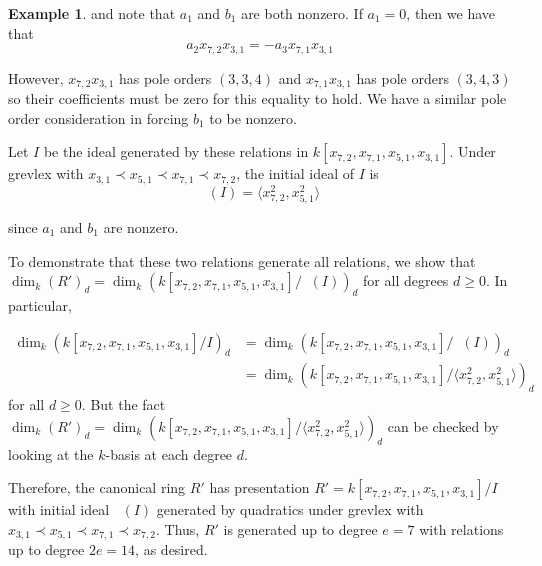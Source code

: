 \documentclass{amsart}
\theoremstyle{plain}
\theoremstyle{definition}
\newtheorem{example}[thm]{Example}
\theoremstyle{remark}
\numberwithin{equation}{section}
\DeclareMathOperator{\initial}{in_\prec}
\begin{document}
\begin{example}
\noindent
and note that $a_1$ and $b_1$ are both nonzero. If $a_1 = 0$, then we
have that
\[
	a_2 x_{7, 2} x_{3, 1} = -a_3 x_{7, 1} x_{3, 1}
\]

\noindent
However, $x_{7, 2} x_{3, 1}$ has pole orders $(3, 3, 4)$ and
$x_{7, 1} x_{3, 1}$ has pole orders $(3, 4, 3)$ so their
coefficients must be zero for this equality to hold. We have a
similar pole order consideration in forcing $b_1$ to be nonzero.

Let $I$ be the ideal generated by these relations in
$k[x_{7, 2}, x_{7, 1}, x_{5, 1}, x_{3, 1}]$. Under grevlex with
$x_{3,1} \prec x_{5,1} \prec x_{7,1} \prec x_{7,2}$, the initial
ideal of $I$ is
\[
	\initial(I) = \langle x_{7, 2}^2, x_{5, 1}^2 \rangle
\]

\noindent
since $a_1$ and $b_1$ are nonzero.

To demonstrate that these two relations generate all 
relations, we show that $\dim_k (R')_d = \dim_k
(k[x_{7, 2}, x_{7, 1}, x_{5, 1}, x_{3, 1}] / \initial(I))_d$ for 
all degrees $d \geq 0$. In particular, 

\begin{align*}
	\dim_k \left(k[x_{7, 2}, x_{7, 1}, x_{5, 1}, x_{3, 1}] / I\right)_d &=
	\dim_k \left(k[x_{7, 2}, x_{7, 1}, x_{5, 1}, x_{3, 1}]	/ \initial(I)\right)_d \\
	&= \dim_k \left(k[x_{7, 2}, x_{7, 1}, x_{5, 1}, x_{3, 1}] / \langle
	x_{7, 2}^2, x_{5, 1}^2 \rangle \right)_d
\end{align*}
\noindent
for all $d \geq 0$. But the fact $\dim_k (R')_d = \dim_k \left(k[x_{7, 2},
x_{7, 1}, x_{5, 1}, x_{3, 1}] / \langle x_{7, 2}^2, x_{5, 1}^2
\rangle\right)_d$ can be checked by looking at the $k$-basis at each degree
$d$.

Therefore, the canonical ring $R'$ has presentation $R' =
k[x_{7, 2}, x_{7, 1}, x_{5, 1}, x_{3, 1}] / I$ with
initial ideal $\initial(I)$ generated by quadratics under grevlex
with $x_{3,1} \prec x_{5,1} \prec x_{7,1} \prec x_{7,2}$.
Thus, $R'$ is generated up to degree $e = 7$ with relations up to
degree $2e = 14$, as desired.

\end{example}
\end{document}
